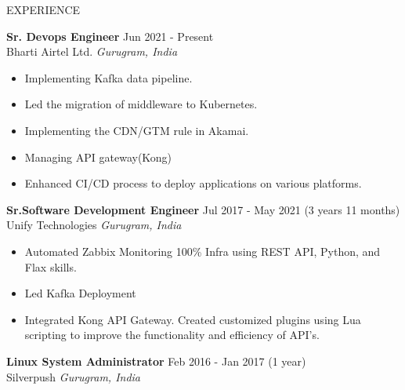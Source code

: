 \documentclass{resume} %
\begin{document}



\begin{rSection}{EXPERIENCE}

\textbf{Sr. Devops Engineer } \hfill Jun 2021 - Present \\
Bharti Airtel Ltd. \hfill \textit{Gurugram, India}
 \begin{itemize}
    \itemsep -3pt {}
     \item Implementing Kafka data pipeline.
     \item Led the migration of middleware to Kubernetes.
     \item Implementing the CDN/GTM rule in Akamai.
     \item Managing API gateway(Kong)
    \item Enhanced CI/CD process to deploy applications on various platforms.
 \end{itemize}

\textbf{Sr.Software Development Engineer} \hfill Jul 2017 - May 2021 (3 years 11 months)\\
Unify Technologies \hfill \textit{Gurugram, India}
 \begin{itemize}
    \itemsep -3pt {}
     \item Automated Zabbix Monitoring 100\% Infra using REST API, Python, and Flax skills.
     \item Led Kafka Deployment
    \item Integrated Kong API Gateway. Created customized plugins using Lua scripting to improve the functionality and efficiency of API's.
 \end{itemize}

\textbf{Linux System Administrator} \hfill Feb 2016 - Jan 2017 (1 year)\\
Silverpush \hfill \textit{Gurugram, India}


\end{rSection}
\end{document}
